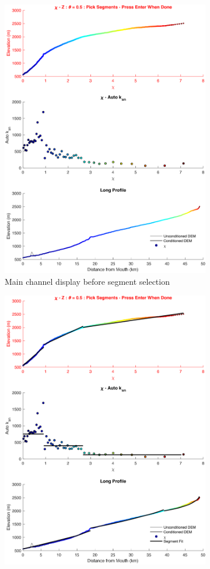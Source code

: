 \begin{figure}[H]
	\centering
	\begin{subfigure}{.5\textwidth}
		\centering
		\includegraphics[width=.8\linewidth]{PNGs/B92_StreamFits_9_preFit.png}
		\caption{Main channel display before segment selection}
		\label{fig:SegSelSub1}
	\end{subfigure}%
	\begin{subfigure}{.5\textwidth}
		\centering
		\includegraphics[width=.8\linewidth]{PNGs/B92_StreamFits_9_postFit.png}

\end{subfigure}
\end{figure}
